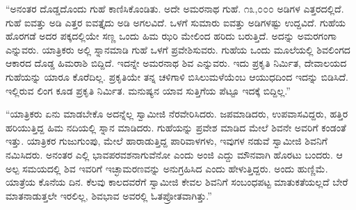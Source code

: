  “ಅನಂತರ ದೊಡ್ಡದೊಂದು ಗುಹೆ ಕಾಣಿಸಿಕೊಂಡಿತು. ಅದೇ ಅಮರನಾಥ ಗುಹೆ. ೧೩,೦೦೦ ಅಡಿಗಳ ಎತ್ತರದಲ್ಲಿದೆ. ಗುಹೆ ಐವತ್ತು ಅಡಿ ಎತ್ತರ ಐವತ್ತೈದು ಅಡಿ ಅಗಲವಿದೆ. ಒಳಗೆ ಸುಮಾರು ಐವತ್ತು ಅಡಿಗಳಷ್ಟು ಉದ್ದವಿದೆ. ಗುಹೆಯ ಹೊರಗಡೆ ಅದರ ಪಕ್ಕದಲ್ಲಿಯೇ ಸಣ್ಣ ಒಂದು ಹಿಮ ಝರಿ ಮೇಲಿಂದ ಹರಿದು ಬರುತ್ತಿದೆ. ಅದನ್ನು ಅಮರಗಂಗಾ ಎನ್ನುವರು. ಯಾತ್ರಿಕರು ಅಲ್ಲಿ ಸ್ನಾನಮಾಡಿ ಗುಹೆ ಒಳಗೆ ಪ್ರವೇಶಿಸುವರು. ಗುಹೆಯ ಒಂದು ಮೂಲೆಯಲ್ಲಿ ಶಿವಲಿಂಗದ ಆಕಾರದ ದೊಡ್ಡ ಹಿಮರಾಶಿ ಬಿದ್ದಿದೆ. ಇದನ್ನೇ ಅಮರನಾಥ ಶಿವ ಎನ್ನುವರು. ಇದು ಪ್ರಕೃತಿ ನಿರ್ಮಿತ, ದೇವಾಲಯದ ಗುಹೆಯನ್ನು ಯಾರೂ ಕೊರೆದಿಲ್ಲ. ಪ್ರಕೃತಿಯೇ ತನ್ನ ಚಳಿಗಾಳಿ ಬಿಸಿಲುಮಳೆಯೆಂಬ ಆಯುಧದಿಂದ ಇದನ್ನು ಬಿಡಿಸಿದೆ. ಇಲ್ಲಿರುವ ಲಿಂಗ ಕೂಡ ಪ್ರಕೃತಿ ನಿರ್ಮಿತ. ಮನುಷ್ಯನ ಯಾವ ಸುತ್ತಿಗೆಯ ಪೆಟ್ಟೂ ಇದಕ್ಕೆ ಬಿದ್ದಿಲ್ಲ.” 

 “ಯಾತ್ರಿಕರು ಏನು ಮಾಡಬೇಕೊ ಅದನ್ನೆಲ್ಲ ಸ್ವಾಮೀಜಿ ನೆರವೇರಿಸಿದರು. ಜಪಮಾಡಿದರು, ಉಪವಾಸವಿದ್ದರು, ಹತ್ತಿರ ಹರಿಯುತ್ತಿದ್ದ ಹಿಮ ನದಿಯಲ್ಲಿ ಸ್ನಾನ ಮಾಡಿದರು. ಗುಹೆಯನ್ನು ಪ್ರವೇಶ ಮಾಡಿದ ಮೇಲೆ ಶಿವನೇ ಅವರಿಗೆ ಕಂಡಂತೆ ಇತ್ತು. ಯಾತ್ರಿಕರ ಗುಜುಗುಂಪು, ಮೇಲೆ ಹಾರಾಡುತ್ತಿದ್ದ ಪಾರಿವಾಳಗಳು, ಇವುಗಳ ನಡುವೆ ಸ್ವಾಮೀಜಿ ಶಿವನಿಗೆ ನಮಿಸಿದರು. ಅನಂತರ ಎಲ್ಲಿ ಭಾವಪರವಶನಾಗುವೆನೋ ಎಂದು ಅಂಜಿ ಎದ್ದು ಮೌನವಾಗಿ ಹೊರಟು ಬಂದರು. ಆ ಅಲ್ಪ ಸಮಯದಲ್ಲಿ ಶಿವ ಇವರಿಗೆ ಇಚ್ಛಾಮರಣವನ್ನು ಅನುಗ್ರಹಿಸಿದ ಎಂದು ಹೇಳುತ್ತಿದ್ದರು. ಅಂದು ಹುಣ್ಣಿಮೆ. ಯಾತ್ರೆಯ ಕೊನೆಯ ದಿನ. ಕೆಲವು ಕಾಲದವರೆಗೆ ಸ್ವಾಮೀಜಿ ಕೇವಲ ಶಿವನಿಗೆ ಸಂಬಂಧಪಟ್ಟ ಮಾತುಕತೆಯಲ್ಲದೆ ಬೇರೆ ಮಾತನಾಡುತ್ತಲೇ ಇರಲಿಲ್ಲ, ಶಿವಭಾವ ಅವರಲ್ಲಿ ಓತಪ್ರೋತವಾಗಿತ್ತು.” 

